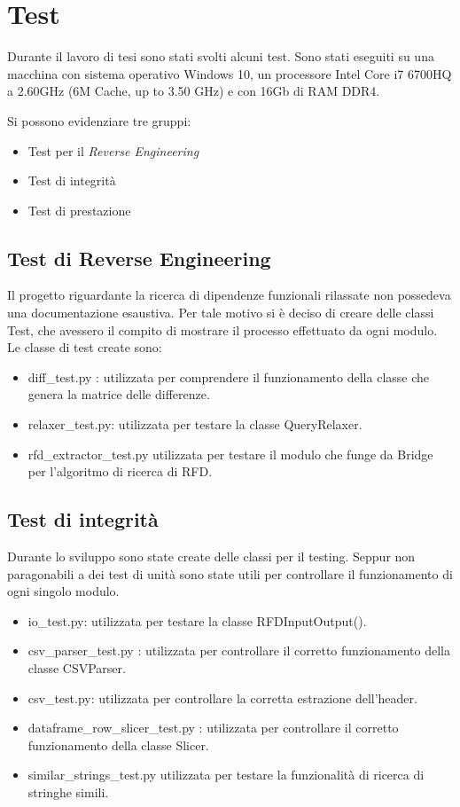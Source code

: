\section{Test}
Durante il lavoro di tesi sono stati svolti alcuni test. 
Sono stati eseguiti su una macchina con sistema operativo Windows 10, un processore Intel Core i7 6700HQ a 2.60GHz (6M Cache, up to 3.50 GHz) e con 16Gb di RAM DDR4.

Si possono evidenziare tre gruppi:
\begin{itemize}
    \item Test per il \textit{Reverse Engineering}
    \item Test di integrità 
    \item Test di prestazione
\end{itemize}

\subsection{Test di Reverse Engineering}
Il progetto riguardante la ricerca di dipendenze funzionali rilassate non possedeva una documentazione esaustiva. Per tale motivo si è deciso di creare delle classi Test, che avessero il compito di mostrare il processo effettuato da ogni modulo.
Le classe di test create sono:
\begin{itemize}[noitemsep]
\let\labelitemi\labelitemii
    \item diff{\_}test.py : utilizzata per comprendere il funzionamento della classe che genera la matrice delle differenze.
    \item relaxer{\_}test.py: utilizzata per testare la classe QueryRelaxer.
    \item rfd{\_}extractor{\_}test.py utilizzata per testare il modulo che funge da Bridge per l'algoritmo di ricerca di RFD.
\end{itemize}

\subsection{Test di integrità}
Durante lo sviluppo sono state create delle classi per il testing. Seppur non paragonabili a dei test di unità sono state utili per controllare il funzionamento di ogni singolo modulo.
\begin{itemize}[noitemsep]
\let\labelitemi\labelitemii
    \item io{\_}test.py: utilizzata per testare la classe RFDInputOutput().
    \item csv{\_}parser{\_}test.py : utilizzata per controllare il corretto funzionamento della classe CSVParser. 
    \item csv{\_}test.py: utilizzata per controllare la corretta estrazione dell'header.
    \item dataframe{\_}row{\_}slicer{\_}test.py : utilizzata per controllare il corretto funzionamento della classe Slicer.
    \item similar{\_}strings{\_}test.py utilizzata per testare la funzionalità di ricerca di stringhe simili.
\end{itemize}
